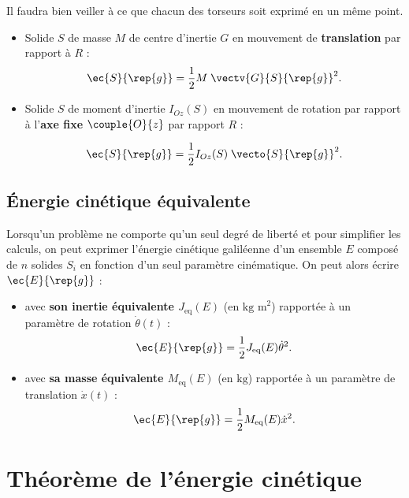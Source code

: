 \begin{warn}
Il faudra bien veiller à ce que chacun des torseurs soit exprimé en un même point.
\end{warn}

\begin{prop}

\begin{itemize}
\item Solide $S$ de masse $M$ de centre d'inertie $G$ en mouvement de \textbf{translation} par rapport à $R$ :
$$
\ec{S}{\rep{g}}=\frac{1}{2}M \; \vectv{G}{S}{\rep{g}}^2.
$$

\item Solide $S$ de moment d'inertie $I_{Oz}(S)$ en mouvement de rotation par rapport à l'\textbf{axe fixe} $\couple{O}{{z}}$ par rapport $R$ :

$$
\ec{S}{\rep{g}}=\frac{1}{2}I_{Oz}(S)\; \vecto{S}{\rep{g}}^2.
$$

\end{itemize}
\end{prop}



\subsection{Énergie cinétique équivalente}

\begin{defi}
Lorsqu'un problème ne comporte qu'un seul degré de liberté et pour simplifier les calculs, on peut exprimer l'énergie cinétique galiléenne d'un ensemble $E$ composé de $n$ solides $S_i$ en fonction d'un seul paramètre cinématique.
On peut alors écrire $\ec{E}{\rep{g}}$ :
\begin{itemize}
\item avec \textbf{son inertie équivalente $J_{\text{eq}}(E)$} (en $\text{kg m}^2$) rapportée à un paramètre de rotation $\dot{\theta}(t)$ : 
$$
\ec{E}{\rep{g}}=\frac{1}{2}J_{\text{eq}}(E) \dot{\theta}^2.
$$
\item avec \textbf{sa masse équivalente $M_{\text{eq}}(E)$} (en $\text{kg}$) rapportée à un paramètre de translation $\dot{x}(t)$ : 
$$
\ec{E}{\rep{g}}=\frac{1}{2}M_{\text{eq}}(E) \dot{x}^2.
$$
\end{itemize}
\end{defi}

\section{Théorème de l'énergie cinétique}
